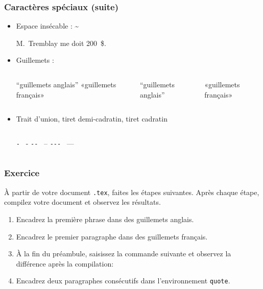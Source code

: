 
\begin{frame}[fragile]

	\frametitle{Caractères spéciaux (suite)}
	
	\begin{itemize}
		\item Espace insécable : \textasciitilde
		
		\begin{codesource}
	M.~Tremblay me doit 200~\$.
		\end{codesource}
	
		\item Guillemets :
		
		\begin{columns}
			
	\begin{codesource}
	``guillemets anglais''
	«guillemets français»	
	\end{codesource}
			
			
			``guillemets anglais''
			
			«guillemets français»
		\end{columns}
	
		\item Trait d'union, tiret demi-cadratin, tiret cadratin
		
		\begin{columns}
			\column{.263 \textwidth}
				\lstinline|-| \faArrowRight\ -
			\column{.263 \textwidth}
				\lstinline|--| \faArrowRight\ --
			\column{.263 \textwidth}
				\lstinline|---| \faArrowRight\ ---
		\end{columns}
	\end{itemize}
\end{frame}


\begin{frame}[fragile]

	\frametitle{Exercice \thenoExercice}
	
	À partir de votre document \texttt{.tex}, faites les étapes suivantes. Après chaque étape,
	compilez votre document et observez les résultats.
	
	\begin{enumerate}
		\item Encadrez la première phrase dans des guillemets anglais.
		\item Encadrez le premier paragraphe dans des guillemets français.
		\item À la fin du préambule, saisissez la commande suivante et observez la différence
		après la compilation:		
	\begin{codesource}
	\end{codesource}
		\item Encadrez deux paragraphes consécutifs dans l'environnement \texttt{quote}.

	\end{enumerate}
\end{frame}
